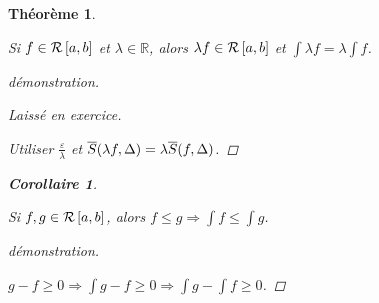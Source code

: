 \documentclass{report}
\newcommand*{\eps}{\varepsilon}
\newcommand*{\reels}{\mathbb{R}}
\newtheorem*{thm}{Th\'eor\`eme}
\newtheorem*{coro}{Corollaire}
\theoremstyle{definition}
\theoremstyle{remark}
\begin{document}
	\begin{thm}
		~

		Si $f \in \riemann$ et $\lambda \in \reels$, alors $\lambda f \in \riemann$ et $\int \lambda f = \lambda \int f$.
		\begin{proof}[d\'emonstration]~

			Laiss\'e en exercice.

			Utiliser $\frac{\eps}{\lambda}$ et $\ssup{\lambda f} = \lambda\ssup{f}$.
		\end{proof}
		\begin{coro}
			~

			Si $f,g \in \riemann$, alors $f \leq g \Rightarrow \int f \leq \int g$.
			\begin{proof}[d\'emonstration]~

				$g-f \geq 0 \Rightarrow \int g-f \geq 0 \Rightarrow \int g - \int f \geq 0$.
			\end{proof}
		\end{coro}
	\end{thm}
\end{document}
